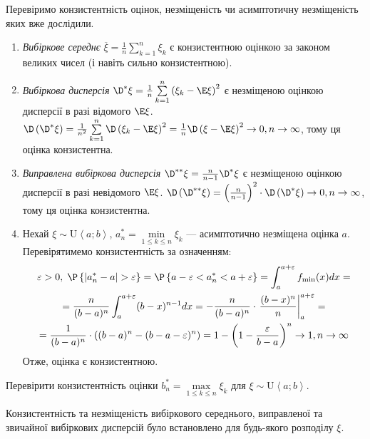 \begin{example}
    Перевіримо конзистентність оцінок, незміщеність чи асимптотичну незміщеність яких вже дослідили.
    \begin{enumerate}
        \item \emph{Вибіркове середнє} $\overline{\xi} = \frac{1}{n}\sum\limits_{k=1}^n \xi_k$ є конзистентною оцінкою
        за законом великих чисел (і навіть сильно конзистентною).
        \item \emph{Вибіркова дисперсія} $\D^*\xi = \frac{1}{n}\sum\limits_{k=1}^n \left(\xi_k - \E\xi \right)^2$
        є незміщеною оцінкою дисперсії в разі відомого $\E\xi$. 
        $\D\left(\D^*\xi\right) = \frac{1}{n^2}\sum\limits_{k=1}^n \D\left(\xi_k - \E\xi \right)^2 =
        \frac{1}{n} \D\left(\xi - \E\xi \right)^2 \to 0, n\to\infty$, тому ця оцінка конзистентна.
        \item \emph{Виправлена вибіркова дисперсія} $\D^{**}\xi = \frac{n}{n-1} \D^*\xi$ є незміщеною оцінкою дисперсії в разі невідомого $\E\xi$. 
        $\D\left(\D^{**}\xi\right) = \left(\frac{n}{n-1} \right)^2 \cdot \D\left(\D^*\xi\right) \to 0, n\to\infty$, тому ця оцінка конзистентна.
        \item Нехай $\xi \sim \mathrm{U}\left< a; b\right>$, $a^*_n = \underset{1\leq k \leq n}{\min}\xi_k$ --- асимптотично незміщена оцінка $a$.
        Перевірятимемо конзистентність за означенням:
        \begin{gather*}
            \varepsilon > 0, \; \P\left\{|a^*_n - a| > \varepsilon\right\} = 
            \P\left\{a - \varepsilon < a^*_n < a + \varepsilon\right\} = \int_{a}^{a+\varepsilon} f_{\min}(x) dx = \\
            = \frac{n}{(b-a)^n}\int_{a}^{a+\varepsilon} (b-x)^{n-1} dx =
            -\frac{n}{(b-a)^n} \cdot \left. \frac{(b-x)^n}{n} \right|_{a}^{a+\varepsilon} = \\
            = \frac{1}{(b-a)^n} \cdot \left( (b-a)^n  - (b-a-\varepsilon)^n\right) = 
            1 - \left(1 - \frac{\varepsilon}{b-a}\right)^n \to 1, n\to\infty
        \end{gather*} 
        Отже, оцінка є конзистентною.
    \end{enumerate}
\end{example}
\begin{exercise}
    Перевірити конзистентність оцінки $b^*_n = \underset{1\leq k \leq n}{\max}\xi_k$ для $\xi \sim \mathrm{U}\left< a; b\right>$.
\end{exercise}
\begin{remark}
    Конзистентність та незміщеність вибіркового середнього, виправленої та звичайної вибіркових дисперсій було встановлено для будь-якого розподілу $\xi$.
\end{remark}

